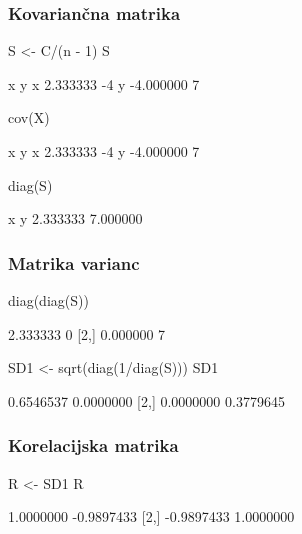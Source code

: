 \begin{frame}[fragile]
\frametitle{Kovariančna matrika}
\begin{Schunk}
\begin{Sinput}
 S <- C/(n - 1)
 S
\end{Sinput}
\begin{Soutput}
          x  y
x  2.333333 -4
y -4.000000  7
\end{Soutput}
\begin{Sinput}
 cov(X)
\end{Sinput}
\begin{Soutput}
          x  y
x  2.333333 -4
y -4.000000  7
\end{Soutput}
\begin{Sinput}
 diag(S)
\end{Sinput}
\begin{Soutput}
       x        y 
2.333333 7.000000 
\end{Soutput}
\end{Schunk}
\end{frame}



\begin{frame}[fragile]
\frametitle{Matrika varianc}
\begin{Schunk}
\begin{Sinput}
 diag(diag(S))
\end{Sinput}
\begin{Soutput}
         [,1] [,2]
[1,] 2.333333    0
[2,] 0.000000    7
\end{Soutput}
\begin{Sinput}
 SD1 <- sqrt(diag(1/diag(S)))
 SD1
\end{Sinput}
\begin{Soutput}
          [,1]      [,2]
[1,] 0.6546537 0.0000000
[2,] 0.0000000 0.3779645
\end{Soutput}
\end{Schunk}
\end{frame}



\begin{frame}[fragile]
\frametitle{Korelacijska matrika}
\begin{Schunk}
\begin{Sinput}
 R <- SD1 %*% S %*% SD1
 R
\end{Sinput}
\begin{Soutput}
           [,1]       [,2]
[1,]  1.0000000 -0.9897433
[2,] -0.9897433  1.0000000
\end{Soutput}
\end{Schunk}
\end{frame}




